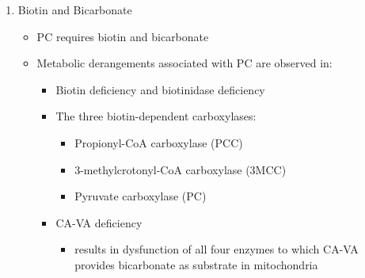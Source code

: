\documentclass{scrartcl}
\begin{document}
\begin{enumerate}
\item Biotin and Bicarbonate
\label{sec:org00abe8d}
\begin{itemize}
\item PC requires biotin and bicarbonate
\item Metabolic derangements associated with PC are observed in:
\begin{itemize}
\item Biotin deficiency and biotinidase deficiency
\item The three biotin-dependent carboxylases:
\begin{itemize}
\item Propionyl-CoA carboxylase (PCC)
\item 3-methylcrotonyl-CoA carboxylase (3MCC)
\item Pyruvate carboxylase (PC)
\end{itemize}

\item CA-VA deficiency
\begin{itemize}
\item results in dysfunction of all four enzymes to which CA-VA
provides bicarbonate as substrate in mitochondria
\end{itemize}
\end{itemize}
\end{itemize}


\end{enumerate}
\end{document}
